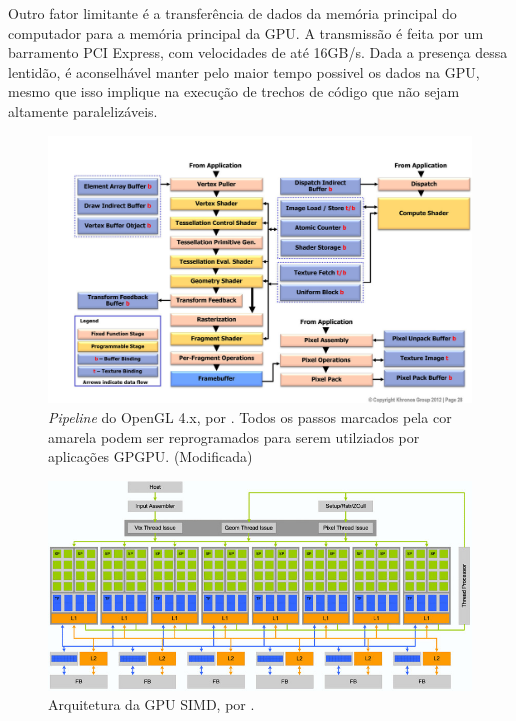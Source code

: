     Outro fator limitante é a transferência de dados da memória principal do computador para a memória
principal da GPU. A transmissão é feita por um barramento PCI Express, com velocidades de até 16GB/s.
Dada a presença dessa lentidão, é aconselhável manter pelo maior tempo possivel
os dados na GPU, mesmo que isso implique na execução de trechos de código que não
sejam altamente paralelizáveis.

\begin{figure}[H]
    \centering
    \includegraphics[width=1\textwidth]{figuras/pipeline.jpg}
    \caption{\textit{Pipeline} do OpenGL 4.x, por \citep{pipeline}. Todos os passos marcados pela cor amarela podem
    ser reprogramados para serem utilziados por aplicações GPGPU. (Modificada)}
    \label{fig:pipeline}
\end{figure}

\begin{figure}[H]
    \centering
    \includegraphics[width=1\textwidth]{figuras/simd.jpg}
    \caption{Arquitetura da GPU SIMD, por \citep{blythe2008rise}.}
    \label{fig:simd}
\end{figure}

